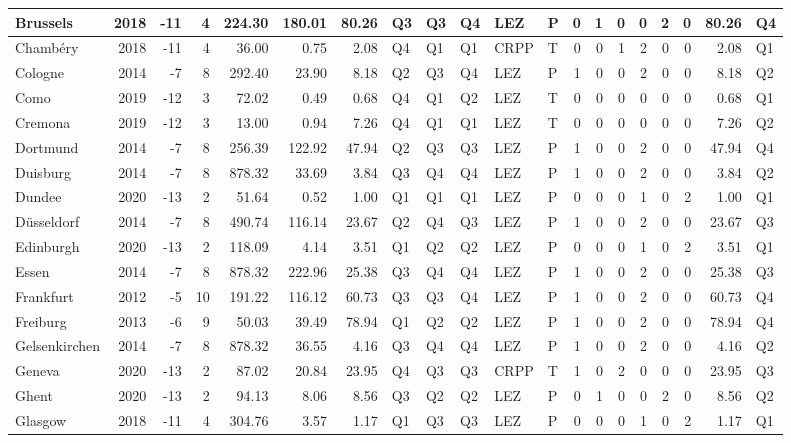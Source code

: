 \begin{tabular}{l|r|r|r|r|r|r|l|l|l|l|l|r|r|r|r|r|r|r|l}
\hline
Brussels & 2018 & -11 & 4 & 224.30 & 180.01 & 80.26 & Q3 & Q3 & Q4 & LEZ & P & 0 & 1 & 0 & 0 & 2 & 0 & 80.26 & Q4\\
\hline
Chambéry & 2018 & -11 & 4 & 36.00 & 0.75 & 2.08 & Q4 & Q1 & Q1 & CRPP & T & 0 & 0 & 1 & 2 & 0 & 0 & 2.08 & Q1\\
\hline
Cologne & 2014 & -7 & 8 & 292.40 & 23.90 & 8.18 & Q2 & Q3 & Q4 & LEZ & P & 1 & 0 & 0 & 2 & 0 & 0 & 8.18 & Q2\\
\hline
Como & 2019 & -12 & 3 & 72.02 & 0.49 & 0.68 & Q4 & Q1 & Q2 & LEZ & T & 0 & 0 & 0 & 0 & 0 & 0 & 0.68 & Q1\\
\hline
Cremona & 2019 & -12 & 3 & 13.00 & 0.94 & 7.26 & Q4 & Q1 & Q1 & LEZ & T & 0 & 0 & 0 & 0 & 0 & 0 & 7.26 & Q2\\
\hline
Dortmund & 2014 & -7 & 8 & 256.39 & 122.92 & 47.94 & Q2 & Q3 & Q3 & LEZ & P & 1 & 0 & 0 & 2 & 0 & 0 & 47.94 & Q4\\
\hline
Duisburg & 2014 & -7 & 8 & 878.32 & 33.69 & 3.84 & Q3 & Q4 & Q4 & LEZ & P & 1 & 0 & 0 & 2 & 0 & 0 & 3.84 & Q2\\
\hline
Dundee & 2020 & -13 & 2 & 51.64 & 0.52 & 1.00 & Q1 & Q1 & Q1 & LEZ & P & 0 & 0 & 0 & 1 & 0 & 2 & 1.00 & Q1\\
\hline
Düsseldorf & 2014 & -7 & 8 & 490.74 & 116.14 & 23.67 & Q2 & Q4 & Q3 & LEZ & P & 1 & 0 & 0 & 2 & 0 & 0 & 23.67 & Q3\\
\hline
Edinburgh & 2020 & -13 & 2 & 118.09 & 4.14 & 3.51 & Q1 & Q2 & Q2 & LEZ & P & 0 & 0 & 0 & 1 & 0 & 2 & 3.51 & Q1\\
\hline
Essen & 2014 & -7 & 8 & 878.32 & 222.96 & 25.38 & Q3 & Q4 & Q4 & LEZ & P & 1 & 0 & 0 & 2 & 0 & 0 & 25.38 & Q3\\
\hline
Frankfurt & 2012 & -5 & 10 & 191.22 & 116.12 & 60.73 & Q3 & Q3 & Q4 & LEZ & P & 1 & 0 & 0 & 2 & 0 & 0 & 60.73 & Q4\\
\hline
Freiburg & 2013 & -6 & 9 & 50.03 & 39.49 & 78.94 & Q1 & Q2 & Q2 & LEZ & P & 1 & 0 & 0 & 2 & 0 & 0 & 78.94 & Q4\\
\hline
Gelsenkirchen & 2014 & -7 & 8 & 878.32 & 36.55 & 4.16 & Q3 & Q4 & Q4 & LEZ & P & 1 & 0 & 0 & 2 & 0 & 0 & 4.16 & Q2\\
\hline
Geneva & 2020 & -13 & 2 & 87.02 & 20.84 & 23.95 & Q4 & Q3 & Q3 & CRPP & T & 1 & 0 & 2 & 0 & 0 & 0 & 23.95 & Q3\\
\hline
Ghent & 2020 & -13 & 2 & 94.13 & 8.06 & 8.56 & Q3 & Q2 & Q2 & LEZ & P & 0 & 1 & 0 & 0 & 2 & 0 & 8.56 & Q2\\
\hline
Glasgow & 2018 & -11 & 4 & 304.76 & 3.57 & 1.17 & Q1 & Q3 & Q3 & LEZ & P & 0 & 0 & 0 & 1 & 0 & 2 & 1.17 & Q1\\

\end{tabular}
